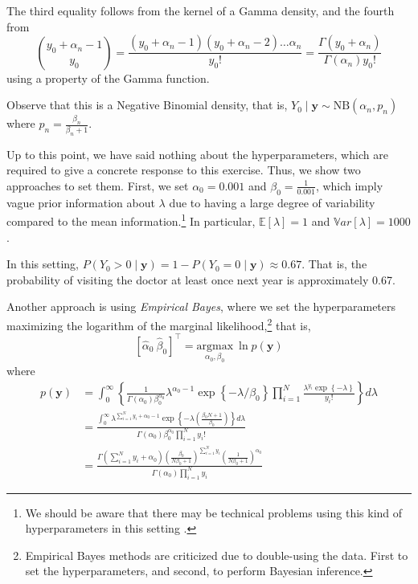 The third equality follows from the kernel of a Gamma density, and the fourth from 
\[
{y_0 + \alpha_n - 1 \choose y_0} = \frac{(y_0 + \alpha_n - 1)(y_0 + \alpha_n - 2)\dots\alpha_n}{y_0!} = \frac{\Gamma(y_0 + \alpha_n)}{\Gamma(\alpha_n) y_0!}
\]
using a property of the Gamma function.

Observe that this is a Negative Binomial density, that is, \( Y_0 \mid \mathbf{y} \sim \text{NB}(\alpha_n, p_n) \) where \( p_n = \frac{\beta_n}{\beta_n + 1} \).

Up to this point, we have said nothing about the hyperparameters, which are required to give a concrete response to this exercise. Thus, we show two approaches to set them. First, we set \( \alpha_0 = 0.001 \) and \( \beta_0 = \frac{1}{0.001} \), which imply vague prior information about \( \lambda \) due to having a large degree of variability compared to the mean information.\footnote{We should be aware that there may be technical problems using this kind of hyperparameters in this setting \cite{gelman2006prior}.} In particular, \( \mathbb{E}[\lambda] = 1 \) and \( \mathbb{V}ar[\lambda] = 1000 \).

In this setting, \( P(Y_0 > 0 \mid \mathbf{y}) = 1 - P(Y_0 = 0 \mid \mathbf{y}) \approx 0.67 \). That is, the probability of visiting the doctor at least once next year is approximately 0.67.

Another approach is using \textit{Empirical Bayes}, where we set the hyperparameters maximizing the logarithm of the marginal likelihood,\footnote{Empirical Bayes methods are criticized due to double-using the data. First to set the hyperparameters, and second, to perform Bayesian inference.} that is,
\[
\left[\hat{\alpha}_0 \ \hat{\beta}_0\right]^{\top} = \underset{\alpha_0, \beta_0}{\mathrm{argmax}} \ \ln p(\mathbf{y})
\]
where
\begin{align*}
	p(\mathbf{y})&=\int_0^{\infty}\left\{\frac{1}{\Gamma(\alpha_0)\beta_0^{\alpha_0}}\lambda^{\alpha_0-1}\exp\left\{-\lambda/\beta_0\right\} \prod_{i=1}^N\frac{\lambda^{y_i}\exp\left\{-\lambda\right\}}{ y_i!}\right\}d\lambda\\
	&=\frac{\int_0^{\infty}\lambda^{\sum_{i=1}^N y_i+\alpha_0-1}\exp\left\{-\lambda \left(\frac{\beta_0 N +1}{\beta_0}\right) \right\}d\lambda}{\Gamma(\alpha_0)\beta_0^{\alpha_0}\prod_{i=1}^N y_i!}\\
	&=\frac{\Gamma(\sum_{i=1}^N y_i+\alpha_0)\left(\frac{\beta_0}{N\beta_0+1}\right)^{\sum_{i=1}^N y_i}\left(\frac{1}{N\beta_0+1}\right)^{\alpha_0}}{\Gamma(\alpha_0)\prod_{i=1}^N y_i}
\end{align*}

